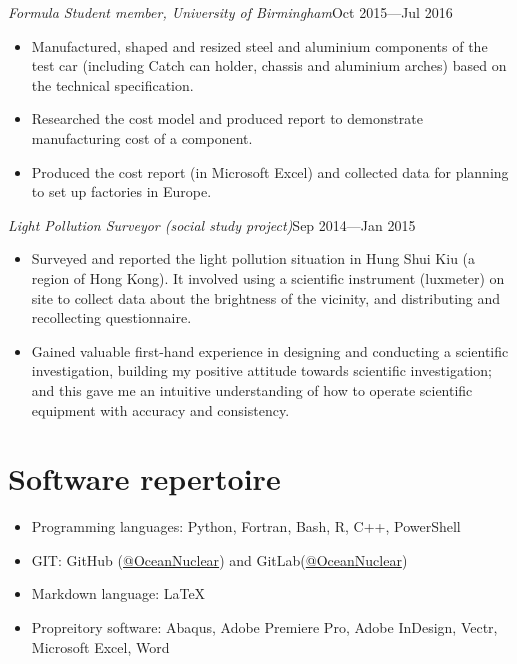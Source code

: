 \documentclass[a4paper, 12pt]{article}
\newcommand{\expentry}[3]{\emph{#1}\hfill{#2}---{#3}}
\begin{document}
\expentry{Formula Student member, University of Birmingham}{Oct 2015}{Jul 2016}
    \begin{itemize}
    \setlength\itemsep{0em}
    \item Manufactured, shaped and resized steel and aluminium components of the test car (including Catch can holder, chassis and aluminium arches) based on the technical specification.
    \item Researched the cost model and produced report to demonstrate manufacturing cost of a component.
    \item Produced the cost report (in Microsoft Excel) and collected data for planning to set up factories in Europe.
    \end{itemize}
\expentry{Light Pollution Surveyor (social study project)}{Sep 2014}{Jan 2015}
    \begin{itemize}
    \setlength\itemsep{0em}
    \item Surveyed and reported the light pollution situation in Hung Shui Kiu (a region of Hong Kong). It involved using a scientific instrument (luxmeter) on site to collect data about the brightness of the vicinity, and distributing and recollecting questionnaire.
    \item Gained valuable first-hand experience in designing and conducting a scientific investigation, building my positive attitude towards scientific investigation; and this gave me an intuitive understanding of how to operate scientific equipment with accuracy and consistency.
    \end{itemize}
\section{Software repertoire} %
    \begin{itemize}
    \item Programming languages: Python, Fortran, Bash, R, C++, PowerShell
    \item GIT: GitHub (\href{https://github.com/OceanNuclear}{@OceanNuclear}) and GitLab(\href{https://gitlab.com/OceanNuclear}{@OceanNuclear})
    \item Markdown language: LaTeX
    \item Propreitory software: Abaqus, Adobe Premiere Pro, Adobe InDesign, Vectr, Microsoft Excel, Word
    \end{itemize}
\end{document}
